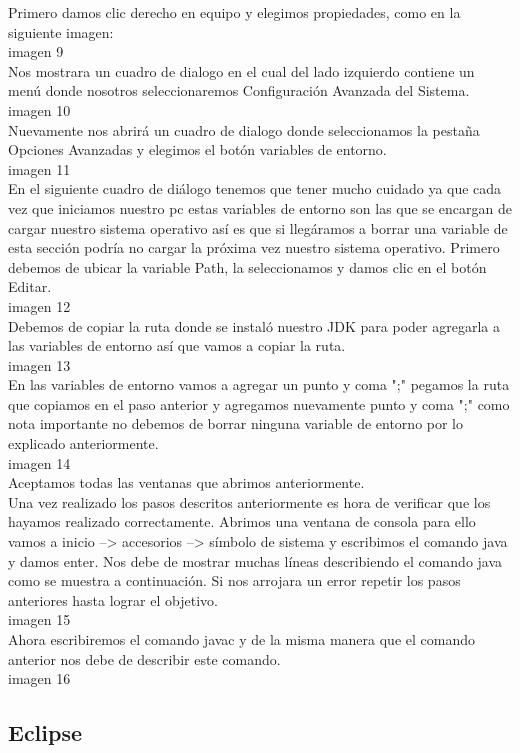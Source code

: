 Primero damos clic derecho en equipo y elegimos propiedades, como en la siguiente imagen:\\
	imagen 9\\
Nos mostrara un cuadro de dialogo en el cual del lado izquierdo contiene un menú donde nosotros seleccionaremos Configuración Avanzada del Sistema.\\
	imagen 10\\
Nuevamente nos abrirá un cuadro de dialogo donde seleccionamos la pestaña Opciones Avanzadas y elegimos el botón variables de entorno.\\
	imagen 11\\
En el siguiente cuadro de diálogo tenemos que tener mucho cuidado ya que cada vez que iniciamos nuestro pc estas variables de entorno son las que se encargan de cargar nuestro sistema operativo así es que si llegáramos a borrar una variable de esta sección podría no cargar la próxima vez nuestro sistema operativo.
Primero debemos de ubicar la variable Path, la seleccionamos y damos clic en el botón Editar.\\
	imagen 12\\
Debemos de copiar la ruta donde se instaló nuestro JDK para poder agregarla a las variables de entorno así que vamos a copiar la ruta.\\
	imagen 13\\
En las variables de entorno vamos a agregar un punto y coma ";" pegamos la ruta que copiamos en el paso anterior y agregamos nuevamente punto y coma ";" como nota importante no debemos de borrar ninguna variable de entorno por lo explicado anteriormente.\\
	imagen 14\\
Aceptamos todas las ventanas que abrimos anteriormente.\\
Una vez realizado los pasos descritos anteriormente es hora de verificar que los hayamos realizado correctamente.
Abrimos una ventana de consola para ello vamos a inicio --> accesorios --> símbolo de sistema y escribimos el comando java y damos enter. Nos debe de mostrar muchas líneas describiendo el comando java como se muestra a continuación. Si nos arrojara un error repetir los pasos anteriores hasta lograr el objetivo.\\
	imagen 15\\
Ahora escribiremos el comando javac y de la misma manera que el comando anterior nos debe de describir este comando.\\
	imagen 16\\

\subsection{Eclipse}
